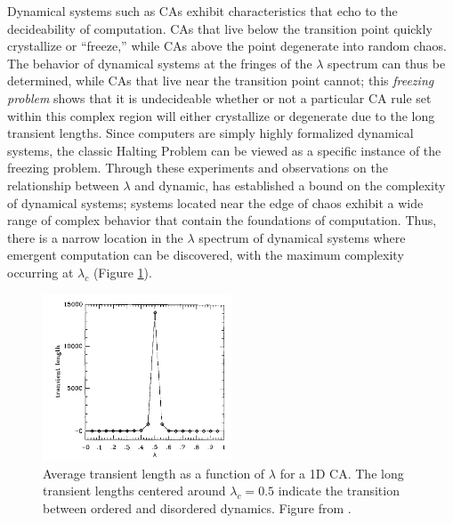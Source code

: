 \documentclass[a4paper,11pt]{report}
\begin{document}
Dynamical systems such as CAs exhibit characteristics that echo to the decideability of computation. CAs that live below the transition point quickly crystallize or ``freeze,'' while CAs above the point degenerate into random chaos. The behavior of dynamical systems at the fringes of the $\lambda$ spectrum can thus be determined, while CAs that live near the transition point cannot; this \textit{freezing problem} shows that it is undecideable whether or not a particular CA rule set within this complex region will either crystallize or degenerate due to the long transient lengths. Since computers are simply highly formalized dynamical systems, the classic Halting Problem can be viewed as a specific instance of the freezing problem. Through these experiments and observations on the relationship between $\lambda$ and dynamic, \citeauthor{la90} has established a bound on the complexity of dynamical systems; systems located near the edge of chaos exhibit a wide range of complex behavior that contain the foundations of computation. Thus, there is a narrow location in the $\lambda$ spectrum of dynamical systems where emergent computation can be discovered, with the maximum complexity occurring at $\lambda_c$ (Figure \ref{fig:lambda_trans}).

\begin{figure}[htp]
\centering
\includegraphics[width=0.5\textwidth]{la90_fig3_lambda_transient_len.png}
\caption[Lambda and Transient Length]{
Average transient length as a function of $\lambda$ for a 1D CA. The long transient lengths centered around $\lambda_c=0.5$ indicate the transition between ordered and disordered dynamics. Figure from \citeauthor{la90} \cite{la90}.
}
\label{fig:lambda_trans}
\end{figure}
\end{document}
